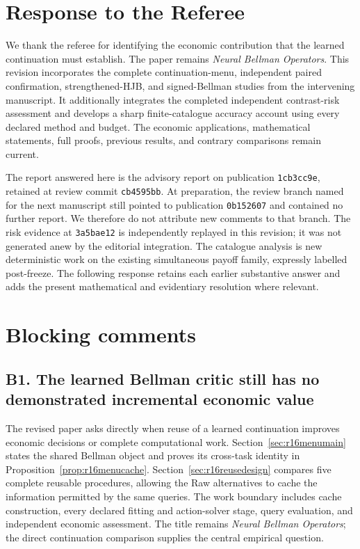 \section*{Response to the Referee}
We thank the referee for identifying the economic contribution that the learned continuation must establish. The paper remains \emph{Neural Bellman Operators}. This revision incorporates the complete continuation-menu, independent paired confirmation, strengthened-HJB, and signed-Bellman studies from the intervening manuscript. It additionally integrates the completed independent contrast-risk assessment and develops a sharp finite-catalogue accuracy account using every declared method and budget. The economic applications, mathematical statements, full proofs, previous results, and contrary comparisons remain current.

The report answered here is the advisory report on publication \texttt{1cb3cc9e}, retained at review commit \texttt{cb4595bb}. At preparation, the review branch named for the next manuscript still pointed to publication \texttt{0b152607} and contained no further report. We therefore do not attribute new comments to that branch. The risk evidence at \texttt{3a5bae12} is independently replayed in this revision; it was not generated anew by the editorial integration. The catalogue analysis is new deterministic work on the existing simultaneous payoff family, expressly labelled post-freeze. The following response retains each earlier substantive answer and adds the present mathematical and evidentiary resolution where relevant.

\section{Blocking comments}
\subsection*{B1. The learned Bellman critic still has no demonstrated incremental economic value}\label{resp:B1}
The revised paper asks directly when reuse of a learned continuation improves economic decisions or complete computational work. Section~\ref{sec:r16menumain} states the shared Bellman object and proves its cross-task identity in Proposition~\ref{prop:r16menucache}. Section~\ref{sec:r16reusedesign} compares five complete reusable procedures, allowing the Raw alternatives to cache the information permitted by the same queries. The work boundary includes cache construction, every declared fitting and action-solver stage, query evaluation, and independent economic assessment. The title remains \emph{Neural Bellman Operators}; the direct continuation comparison supplies the central empirical question.

